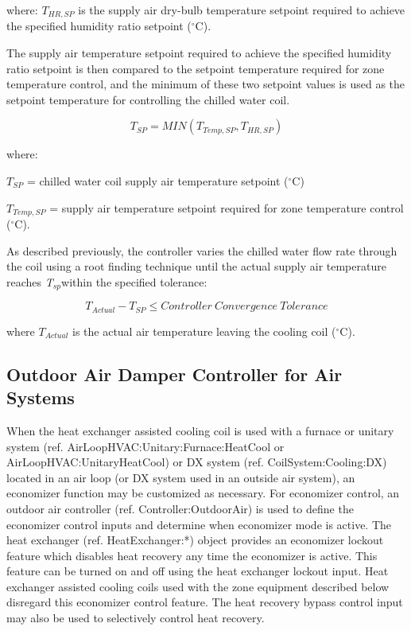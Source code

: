 where: \({T_{HR,SP}}\) is the supply air dry-bulb temperature setpoint required to achieve the specified humidity ratio setpoint (\(^{\circ}\)C).

The supply air temperature setpoint required to achieve the specified humidity ratio setpoint is then compared to the setpoint temperature required for zone temperature control, and the minimum of these two setpoint values is used as the setpoint temperature for controlling the chilled water coil.

\begin{equation}
{T_{SP}} = MIN\left( {{T_{Temp,SP}},{T_{HR,SP}}} \right)
\end{equation}

where:

\({T_{SP}}\) = chilled water coil supply air temperature setpoint (\(^{\circ}\)C)

\({T_{Temp,SP}}\) = supply air temperature setpoint required for zone temperature control (\(^{\circ}\)C).

As described previously, the controller varies the chilled water flow rate through the coil using a root finding technique until the actual supply air temperature reaches \emph{T\(_{sp}\)}within the specified tolerance:

\begin{equation}
{T_{Actual}} - {T_{SP}} \le Controller~Convergence~Tolerance
\end{equation}

where \({T_{Actual}}\) is the actual air temperature leaving the cooling coil (\(^{\circ}\)C).

\subsection{Outdoor Air Damper Controller for Air Systems}\label{outdoor-air-damper-controller-for-air-systems}

When the heat exchanger assisted cooling coil is used with a furnace or unitary system (ref. AirLoopHVAC:Unitary:Furnace:HeatCool or AirLoopHVAC:UnitaryHeatCool) or DX system (ref. CoilSystem:Cooling:DX) located in an air loop (or DX system used in an outside air system), an economizer function may be customized as necessary. For economizer control, an outdoor air controller (ref. Controller:OutdoorAir) is used to define the economizer control inputs and determine when economizer mode is active. The heat exchanger (ref. HeatExchanger:*) object provides an economizer lockout feature which disables heat recovery any time the economizer is active. This feature can be turned on and off using the heat exchanger lockout input. Heat exchanger assisted cooling coils used with the zone equipment described below disregard this economizer control feature. The heat recovery bypass control input may also be used to selectively control heat recovery.


